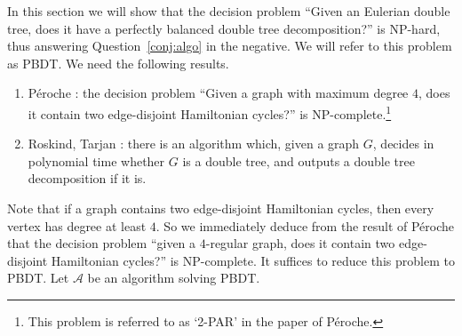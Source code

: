 \documentclass[11pt, reqno, a4paper]{article}
\theoremstyle{definition}
\numberwithin{equation}{section}
\begin{document}
In this section we will show that the decision problem ``Given an Eulerian double tree, does it have a perfectly balanced double tree decomposition?'' is NP-hard, thus answering Question~\ref{conj:algo} in the negative.
We will refer to this problem as PBDT.
We need the following results.
\begin{enumerate}
\item P\'eroche \cite{peroche1984npcompleteness}: the decision problem ``Given a graph with maximum degree $4$, does it contain two edge-disjoint Hamiltonian cycles?'' is NP-complete.\footnote{This problem is referred to as `2-PAR' in the paper of P\'eroche.}
\item Roskind, Tarjan \cite{roskind1985ano}: there is an algorithm which, given a graph $G$, decides in polynomial time whether $G$ is a double tree, and outputs a double tree decomposition if it is.
\end{enumerate}
Note that if a graph contains two edge-disjoint Hamiltonian cycles, then every vertex has degree at least $4$.
So we immediately deduce from the result of P\'eroche that the decision problem ``given a $4$-regular graph, does it contain two edge-disjoint Hamiltonian cycles?'' is NP-complete.
It suffices to reduce this problem to PBDT. Let $\mathcal{A}$ be an algorithm solving PBDT.
\end{document}

